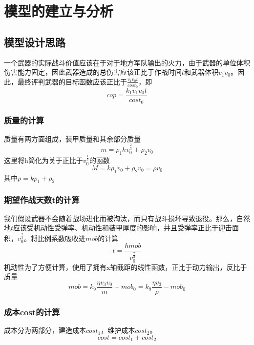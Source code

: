 \documentclass[UTF8]{mcmthesis}
\begin{document}
\section{模型的建立与分析}
\subsection{模型设计思路}
一个武器的实际战斗价值应该在于对于地方军队输出的火力，由于武器的单位体积伤害能力固定，因此武器造成的总伤害应该正比于作战时间$t$和武器体积$v_1v_0$。因此，最终评判武器的目标函数应该正比于$\frac{v_1v_0t}{cost_0}$，即
\begin{equation}
cop=\frac{k_1v_1v_0t}{cost_0}
\end{equation}
\subsubsection{质量的计算}
质量有两方面组成，装甲质量和其余部分质量
\begin{equation}
m=\rho_1hv_0^{\frac{2}{3}}+\rho_2v_0
\end{equation}
这里将h简化为关于正比于$v_0^{\frac{1}{3}}$的函数
\begin{equation}
M=k\rho_1v_0+\rho_2v_0=\rho v_0
\end{equation}
其中$\rho=k\rho_1+\rho_2$
\subsubsection{期望作战天数t的计算}
我们假设武器不会随着战场进化而被淘汰，而只有战斗损坏导致退役。那么，自然地$t$应该受机动性受弹率、机动性和装甲厚度的影响，并且受弹率正比于迎击面积，$v_0^{\frac{2}{3}}$。将比例系数吸收进$mob$的计算
\begin{equation}
t=\frac{h mob}{v_0^{\frac{2}{3}}}
\end{equation}
机动性为了方便计算，使用了拥有x轴截距的线性函数，正比于动力输出，反比于质量
\begin{equation}
mob=k_9\frac{\eta v_3v_0}{m}-mob_0=k_9\frac{\eta v_3}{\rho}-mob_0
\end{equation}
\subsubsection{成本cost的计算}
成本分为两部分，建造成本$cost_1$，维护成本$cost_2$。
\begin{equation}
cost=cost_1+cost_2
\end{equation}
\end{document}
